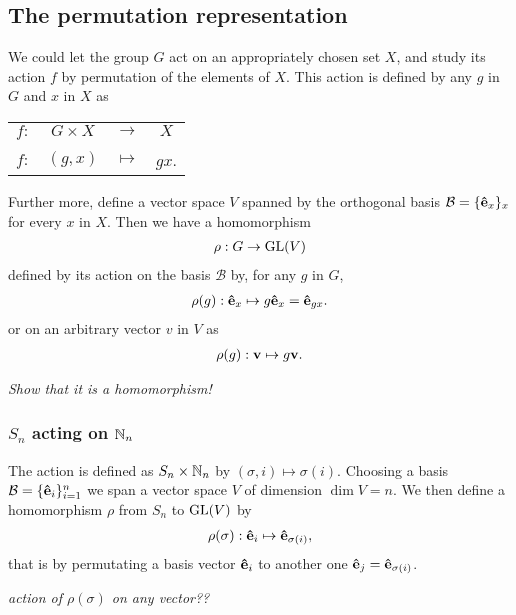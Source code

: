 	\subsection{The permutation representation}
	
	We could let the group $G$ act on an appropriately chosen set $X$, and study its action $f$ by permutation of the elements of $X$. This action is defined by any $g$ in $G$ and $x$ in $X$ as
	\begin{table}[hbt!]\centering\begin{tabular}{c c c c}
			$f:$ & $G \times X$    & $\rightarrow$ & $X$ \\
			&\rotatebox[origin=c]{90}{$\in$}&&\rotatebox[origin=c]{90}{$\in$} \\
			$f:$ & $(g,x)$ & $\mapsto$     & $gx$.
	\end{tabular}\end{table}

	Further more, define a vector space $V$ spanned by the orthogonal basis $\mathcal{B} = \{\mathbf{\hat{e}}_x\}_x$ for every $x$ in $X$. Then we have a homomorphism
	\begin{align}
		\rho: G \rightarrow \text{GL}(V)
	\end{align}
	defined by its action on the basis $\mathcal{B}$ by, for any $g$ in $G$,
	\begin{align}
		\rho(g): \mathbf{\hat{e}}_x \mapsto g\mathbf{\hat{e}}_x = \mathbf{\hat{e}}_{gx}.
	\end{align}
	or on an arbitrary vector $v$ in $V$ as
	\begin{align}
		\rho(g): \mathbf{v} \mapsto g\mathbf{v}.
	\end{align}
	
	\textit{Show that it is a homomorphism!}
	
	\subsubsection{$S_n$ acting on $\mathbb{N}_n$}
		The action is defined as $S_n \times \mathbb{N}_n$ by $(\sigma,i) \mapsto \sigma(i)$. Choosing a basis $\mathcal{B} = \{\mathbf{\hat{e}}_i\}_{i=1}^n$ we span a vector space $V$ of dimension $\dim V = n$. We then define a homomorphism $\rho$ from $S_n$ to $\text{GL}(V)$ by
		\begin{align}
			\rho(\sigma): \mathbf{\hat{e}}_i \mapsto \mathbf{\hat{e}}_{\sigma(i)},
		\end{align}
		that is by permutating a basis vector $\mathbf{\hat{e}}_i$ to another one $\mathbf{\hat{e}}_j = \mathbf{\hat{e}}_{\sigma(i)}$.
		
		\textit{action of $\rho(\sigma)$ on any vector??}
		

